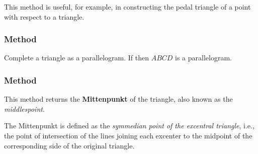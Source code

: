 \medskip
\noindent
This method is useful, for example, in constructing the pedal triangle of a point with respect to a triangle.

\vspace{1em}


\begin{tkzexample}[latex = 7cm]
  \begin{center}
    \end{center}
\end{tkzexample}

\subsubsection{Method }
\label{ssub:method_triangle_parallelogram}
Complete a triangle as a parallelogram. If  then  $ABCD$ is a parallelogram.

\subsubsection{Method } %
\label{ssub:method_triangle_mittenpunkt}

This method returns the \textbf{Mittenpunkt} of the triangle, also known as the \emph{middlespoint}.

\medskip
\noindent
The Mittenpunkt is defined as the \emph{symmedian point of the excentral triangle}, i.e., the point of intersection of the lines joining each excenter to the midpoint of the corresponding side of the original triangle.

